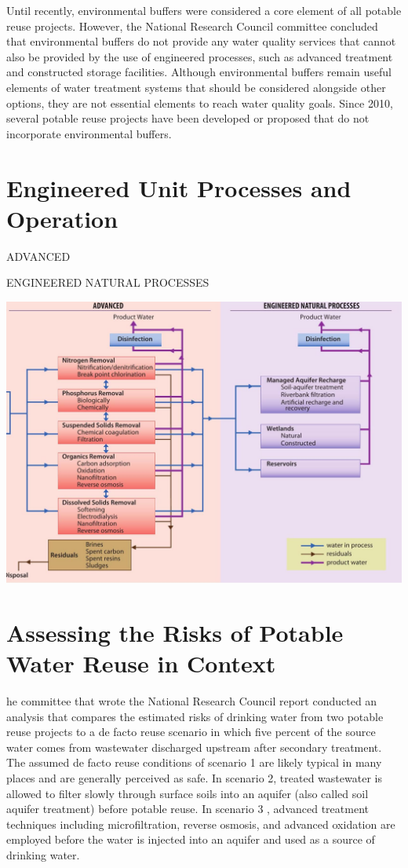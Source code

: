 \documentclass[10pt]{article}
\begin{document}
Until recently, environmental buffers were considered a core element of all potable reuse projects. However, the National Research Council committee concluded that environmental buffers do not provide any water quality services that cannot also be provided by the use of engineered processes, such as advanced treatment and constructed storage facilities. Although environmental buffers remain useful elements of water treatment systems that should be considered alongside other options, they are not essential elements to reach water quality goals. Since 2010, several potable reuse projects have been developed or proposed that do not incorporate environmental buffers.

\section{Engineered Unit Processes and Operation}
ADVANCED

ENGINEERED NATURAL PROCESSES

\includegraphics[max width=\textwidth]{2022_11_05_93277ca2de7ec5580550g-08}

\section{Assessing the Risks of Potable Water Reuse in Context}
he committee that wrote the National Research Council report conducted an analysis that compares the estimated risks of drinking water from two potable reuse projects to a de facto reuse scenario in which five percent of the source water comes from wastewater discharged upstream after secondary treatment. The assumed de facto reuse conditions of scenario 1 are likely typical in many places and are generally perceived as safe. In scenario 2, treated wastewater is allowed to filter slowly through surface soils into an aquifer (also called soil aquifer treatment) before potable reuse. In scenario 3 , advanced treatment techniques including microfiltration, reverse osmosis, and advanced oxidation are employed before the water is injected into an aquifer and used as a source of drinking water.
\end{document}
